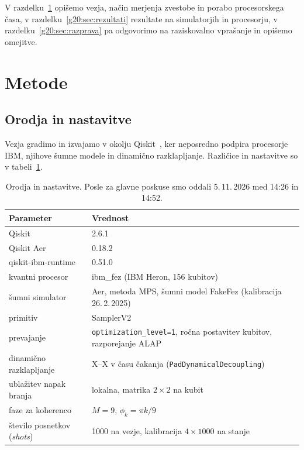 V razdelku~\ref{g20:sec:metode} opišemo vezja, način merjenja zvestobe in porabo procesorskega časa,
v razdelku~\ref{g20:sec:rezultati} rezultate na simulatorjih in procesorju, v razdelku~\ref{g20:sec:razprava} pa odgovorimo
na raziskovalno vprašanje in opišemo omejitve.


\section{Metode}
\label{g20:sec:metode}

\subsection{Orodja in nastavitve}
\label{g20:sec:orodja}

Vezja gradimo in izvajamo v okolju Qiskit~\cite{qiskit2024}, ker neposredno podpira procesorje IBM, njihove šumne modele in
dinamično razklapljanje. Različice in nastavitve so v tabeli~\ref{g20:tab:orodja}.

\begin{table}[htbp]
\caption{Orodja in nastavitve. Posle za glavne poskuse smo oddali 5.\,11.\,2026 med 14:26 in 14:52.}
\label{g20:tab:orodja}
\centering
\begin{tabular}{ll}
\toprule
Parameter & Vrednost \\
\midrule
Qiskit & 2.6.1 \\
Qiskit Aer & 0.18.2 \\
qiskit-ibm-runtime & 0.51.0 \\
kvantni procesor & ibm\_fez (IBM Heron, 156 kubitov) \\
šumni simulator & Aer, metoda MPS, šumni model FakeFez (kalibracija 26.\,2.\,2025) \\
primitiv & SamplerV2 \\
prevajanje & \texttt{optimization\_level=1}, ročna postavitev kubitov, razporejanje ALAP \\
dinamično razklapljanje & X--X v času čakanja (\texttt{PadDynamicalDecoupling}) \\
ublažitev napak branja & lokalna, matrika $2\times2$ na kubit \\
faze za koherenco & $M=9$, $\phi_k=\pi k/9$ \\
število posnetkov (\emph{shots}) & 1000 na vezje, kalibracija $4\times1000$ na stanje \\
\bottomrule
\end{tabular}
\end{table}

